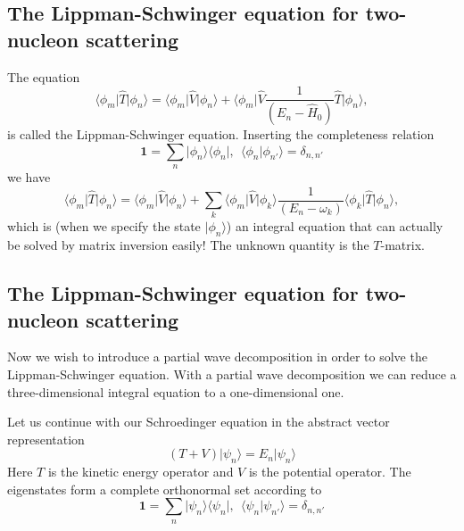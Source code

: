 \documentclass[%
twoside,                 %
final,                   %
10pt]{article}
\begin{document}
\subsection{The Lippman-Schwinger equation for two-nucleon scattering}
\begin{block}{}
The equation
\[
\langle \phi_m \vert\hat{T}\vert \phi_n \rangle =\langle \phi_m \vert\hat{V}\vert\phi_n \rangle+\langle \phi_m \vert\hat{V}\frac{1}{(E_n -\hat{H}_0)}\hat{T}\vert \phi_n \rangle,
\]
is called the Lippman-Schwinger equation. Inserting the completeness relation
\[ 
\mathbf{1} = \sum_n \vert \phi_n\rangle\langle \phi_n \vert, \:\: \langle \phi_n\vert \phi_{n'} \rangle = \delta_{n,n'}
\]
we have 
\[
\langle \phi_m \vert\hat{T}\vert \phi_n \rangle =\langle \phi_m \vert\hat{V}\vert\phi_n \rangle+\sum_k \langle \phi_m \vert\hat{V}\vert \phi_k\rangle\frac{1}{(E_n -\omega_k)}\langle \phi_k \vert\hat{T}\vert \phi_n \rangle,
\]
which is (when we specify the state $\vert\phi_n \rangle$) an integral equation that can actually be solved by matrix inversion easily! The unknown quantity is the $T$-matrix.
\end{block}

\subsection{The Lippman-Schwinger equation for two-nucleon scattering}
\begin{block}{}
Now we wish to introduce a partial wave decomposition in order to solve the Lippman-Schwinger equation. With a partial wave decomposition we can reduce a three-dimensional integral equation to a one-dimensional one. 

Let us continue with our Schroedinger equation in the abstract vector representation
\[
\left(T + V\right)\vert\psi_n\rangle = E_n\vert\psi_n \rangle 
\]
Here $T$ is the kinetic energy operator and $V$ is the potential operator. 
The eigenstates form a complete orthonormal set according to 
\[ 
\mathbf{1}=\sum_n\vert\psi_n\rangle\langle\psi_n\vert, \:\: \langle\psi_n\vert\psi_{n'}\rangle =\delta_{n,n'}
\]
\end{block}

\end{document}
